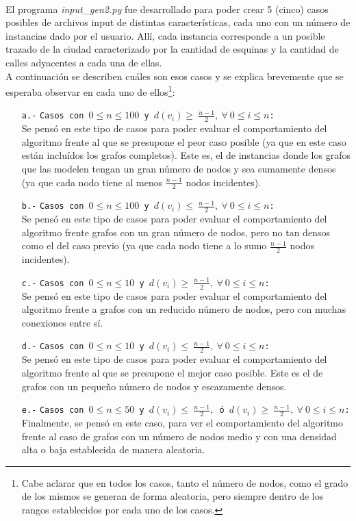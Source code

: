 \paragraph{}
El programa \textit{input\_gen2.py} fue desarrollado para poder crear 5 (cinco) casos posibles de archivos input de distintas características, cada uno con un número de instancias dado por el usuario. Allí, cada instancia corresponde a un posible trazado de la ciudad caracterizado por la cantidad de esquinas y la cantidad de calles adyacentes a cada una de ellas. \\
A continuación se describen cuáles son esos casos y se explica brevemente que se esperaba observar en cada uno de ellos\footnote{Cabe aclarar que en todos los casos, tanto el número de nodos, como el grado de los mismos se generan de forma aleatoria, pero siempre dentro de los rangos establecidos por cada uno de los casos.}:
	\begin{itemize}
		\item[\texttt{a.-}]{\texttt{Casos con $0 \leq n \leq 100$ y $d(v_i) \geq\ \frac{n-1}{2},\ \forall\ 0 \leq i \leq n$:} \\
		Se pensó en este tipo de casos para poder evaluar el comportamiento del algoritmo frente al que se presupone el peor caso posible (ya que en este caso están incluídos los grafos completos). Este es, el de instancias donde los grafos que las modelen tengan un gran número de nodos y sea sumamente densos (ya que cada nodo tiene al menos $\frac{n-1}{2}$ nodos incidentes).} 
		\item[\texttt{b.-}]{\texttt{Casos con $0 \leq n \leq 100$ y $d(v_i) \leq\ \frac{n-1}{2},\ \forall\ 0 \leq i \leq n$:} \\
		Se pensó en este tipo de casos para poder evaluar el comportamiento del algoritmo frente grafos con un gran número de nodos, pero no tan densos como el del caso previo (ya que cada nodo tiene a lo sumo $\frac{n-1}{2}$ nodos incidentes).} 
		\item[\texttt{c.-}]{\texttt{Casos con $0 \leq n \leq 10$ y $d(v_i) \geq\ \frac{n-1}{2},\ \forall\ 0 \leq i \leq n$:} \\
		Se pensó en este tipo de casos para poder evaluar el comportamiento del algoritmo frente a grafos con un reducido número de nodos, pero con muchas conexiones entre sí.}
		\item[\texttt{d.-}]{\texttt{Casos con $0 \leq n \leq 10$ y $d(v_i) \leq\ \frac{n-1}{2},\ \forall\ 0 \leq i \leq n$:} \\
		Se pensó en este tipo de casos para poder evaluar el comportamiento del algoritmo frente al que se presupone el mejor caso posible. Este es el de grafos con un pequeño número de nodos y escazamente densos.} 
		\item[\texttt{e.-}]{\texttt{Casos con $0 \leq n \leq 50$ y $d(v_i) \leq\ \frac{n-1}{2},$ ó $d(v_i) \geq\ \frac{n-1}{2},\ \forall\ 0 \leq i \leq n$:} \\ 
		Finalmente, se pensó en este caso, para ver el comportamiento del algoritmo frente al caso de grafos con un número de nodos medio y con una densidad alta o baja establecida de manera aleatoria.}
	\end{itemize}  

